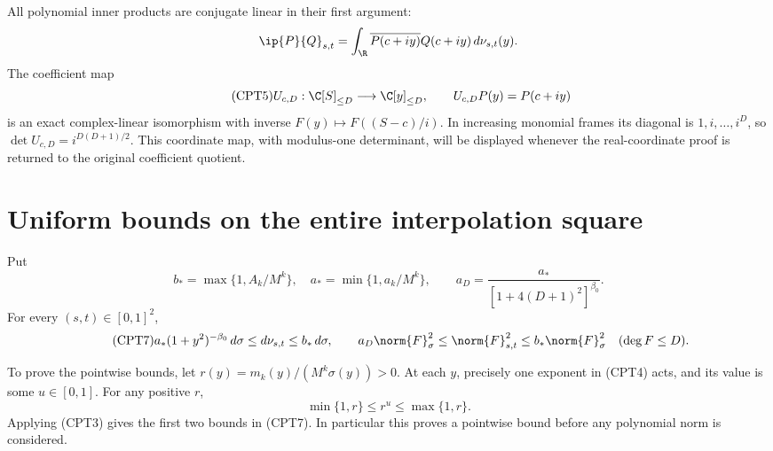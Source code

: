 \documentclass[11pt,a4paper]{article}
\begin{document}
All polynomial inner products are conjugate linear in their first
argument:
\[
 \ip{P}{Q}_{s,t}
 =\int_{\R}\overline{P(c+iy)}Q(c+iy)\,d\nu_{s,t}(y).
\]
The coefficient map
\begin{equation}\tag{CPT5}
 U_{c,D}:\C[S]_{\le D}\longrightarrow\C[y]_{\le D},
 \qquad U_{c,D}P(y)=P(c+iy)
\end{equation}
is an exact complex-linear isomorphism with inverse
\(F(y)\mapsto F((S-c)/i)\).  In increasing monomial frames its
diagonal is \(1,i,\ldots,i^D\), so
\(\det U_{c,D}=i^{D(D+1)/2}\).  This coordinate map, with modulus-one
determinant, will be displayed whenever the real-coordinate proof is
returned to the original coefficient quotient.

\section{Uniform bounds on the entire interpolation square}

Put
\begin{equation}\tag{CPT6}
 b_*=\max\{1,A_k/M^k\},\quad a_*=\min\{1,a_k/M^k\},
 \qquad
 a_D=\frac{a_*}{[1+4(D+1)^2]^{\beta_0}}.
\end{equation}
For every \((s,t)\in[0,1]^2\),
\begin{equation}\tag{CPT7}
 a_*(1+y^2)^{-\beta_0}\,d\sigma
 \le d\nu_{s,t}\le b_*\,d\sigma,\qquad
 a_D\norm{F}_\sigma^2\le\norm{F}_{s,t}^2
 \le b_*\norm{F}_\sigma^2\quad(\deg F\le D).
\end{equation}

To prove the pointwise bounds, let
\(r(y)=m_k(y)/(M^k\sigma(y))>0\).
At each \(y\), precisely one exponent in (CPT4) acts, and its value
is some \(u\in[0,1]\).  For any positive \(r\),
\[
 \min\{1,r\}\le r^u\le\max\{1,r\}.
\]
Applying (CPT3) gives the first two bounds in (CPT7).
In particular this proves a pointwise bound before any polynomial norm
is considered.
\end{document}
